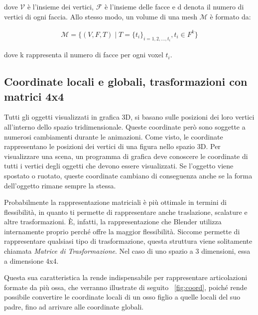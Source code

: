 dove \(\mathcal{V}\) è l'insieme dei vertici, \(\mathcal{F}\) è l'insieme delle facce e d denota il numero di vertici di ogni faccia. Allo stesso modo, un volume di una mesh \(\mathcal{M}\) è formato da:

\begin{align*}
    \mathcal{M} = \{ (V,F,T) \mid
    T = \{ t_i \}_{i=1,2,\dots,t_i}, t_i \in F^k \}
\end{align*}

dove k rappresenta il numero di facce per ogni voxel $t_i$.

\subsection{Coordinate locali e globali, trasformazioni con matrici 4x4}
Tutti gli oggetti visualizzati in grafica 3D, si basano sulle posizioni dei loro vertici all'interno dello spazio tridimensionale. Queste coordinate però sono soggette a numerosi cambiamenti durante le animazioni.
Come visto, le coordinate rappresentano le posizioni dei vertici di una figura nello spazio 3D. Per visualizzare una scena, un programma di grafica deve conoscere le coordinate di tutti i vertici degli oggetti che devono essere visualizzati. Se l'oggetto viene spostato o ruotato, queste coordinate cambiano di conseguenza anche se la forma dell'oggetto rimane sempre la stessa.

Probabilmente la rappresentazione matriciali è più ottimale in termini di flessibilità, in quanto ti permette di rappresentare anche traslazione, scalature e altre trasformazioni. È, infatti, la rappresentazione che Blender utilizza internamente  proprio perché offre la maggior flessibilità. Siccome permette di rappresentare qualsiasi tipo di trasformazione, questa struttura viene solitamente chiamata \textit{Matrice di Trasformazione}. Nel caso di uno spazio a 3 dimensioni, essa a dimensione 4x4.~\cite{tec:2018}

Questa sua caratteristica la rende indispensabile per rappresentare articolazioni formate da più ossa, che verranno illustrate di seguito ~\ref{fig:coord}, poiché rende possibile convertire le coordinate locali di un osso figlio a quelle locali del suo padre, fino ad arrivare alle coordinate globali.

